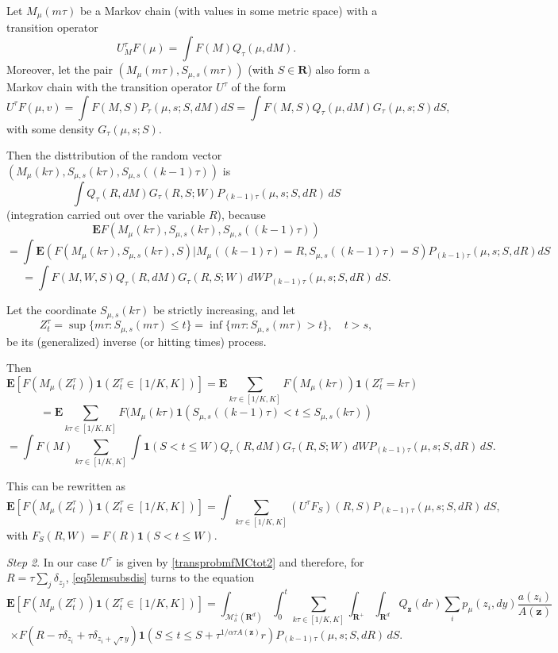 \documentclass[12pt]{article}
\def\MC{\mathcal{M}}
\def\E{\mathbf{E}}
\def\R{\mathbf{R}}
\def\1{\mathbf{1}}
\def\z{\mathbf{z}}
\def\al{\alpha}
\def\de{\delta}
\numberwithin{equation}{section}
\begin{document}
Let $M_{\mu}(m\tau)$ be a Markov chain (with values in some metric space)
with a transition operator
\[
U^{\tau}_M F(\mu)=\int F(M) Q_{\tau} (\mu,dM).
\]
Moreover, let the pair $(M_{\mu}(m\tau), S_{\mu,s}(m\tau))$ (with $S \in \R$) also form a Markov chain with the
transition operator $U^{\tau}$ of the form
\[
U^{\tau}F(\mu,v)=\int F(M,S) P_{\tau} (\mu,s; S, dM) dS
=\int F(M,S) Q_{\tau} (\mu,dM) G_{\tau} (\mu,s; S) dS,
\]
with some density  $G_{\tau} (\mu,s; S)$.

Then the disttribution of the random vector $(M_{\mu}(k\tau), S_{\mu,s}(k\tau), S_{\mu,s}((k-1)\tau))$ is
\begin{equation}
 \label{eqjointdis}
\int Q_{\tau}(R,dM) G_{\tau}(R,S;W) P_{(k-1)\tau}(\mu,s; S, dR)\, dS
\end{equation}
(integration carried out over the variable $R$),  because
\[
\E F (M_{\mu}(k\tau), S_{\mu,s}(k\tau), S_{\mu,s}((k-1)\tau))
\]
\[
=\int \E (F(M_{\mu}(k\tau), S_{\mu,s}(k\tau), S)|M_{\mu}((k-1)\tau)=R, S_{\mu,s}((k-1)\tau)=S)P_{(k-1)\tau}(\mu,s; S, dR) dS
\]
\[
=\int F(M, W, S)Q_{\tau}(R,dM) G_{\tau}(R,S;W) \, dW P_{(k-1)\tau}(\mu,s; S, dR) \, dS.
\]


Let the coordinate $S_{\mu,s}(k\tau)$ be strictly increasing, and let
\[
Z_t^{\tau}=\sup\{ m\tau : S_{\mu,s}(m\tau)\le t\}=\inf\{ m\tau: S_{\mu,s}(m\tau)> t\}, \quad t>s,
\]
be its (generalized) inverse (or hitting times) process.

Then
\[
\E [F(M_{\mu}(Z_t^{\tau}))\1(Z_t^{\tau}\in [1/K,K])]
=\E \sum_{k \tau \in  [1/K,K]} F(M_{\mu}(k\tau)) \1(Z^{\tau}_t=k\tau)
\]
\[
=\E \sum_{k \tau \in  [1/K,K]} F(M_{\mu}(k\tau) \1(S_{\mu,s}((k-1)\tau)<t\le S_{\mu,s}(k\tau))
\]
\begin{equation}
 \label{eq4lemsubsdis}
 = \int F(M) \sum_{k \tau \in  [1/K,K]} \int \1(S<t\le W)
  Q_{\tau}(R,dM) G_{\tau}(R,S;W) \, dW P_{(k-1)\tau}(\mu,s; S, dR) \, dS.
\end{equation}

This can be rewritten as
\begin{equation}
 \label{eq5lemsubsdis}
\E [F(M_{\mu}(Z_t^{\tau}))\1(Z_t^{\tau}\in [1/K,K])]
 = \int \sum_{k \tau \in  [1/K,K]} (U^{\tau}F_S)(R,S) P_{(k-1)\tau}(\mu,s; S, dR)\, dS,
\end{equation}
with $F_S(R,W)= F(R)  \1(S<t\le W)$.

{\it Step 2}. In our case $U^{\tau}$ is given by \eqref{transprobmfMCtot2} and therefore,
for $R=\tau \sum_j\de_{z_j}$,
\eqref{eq5lemsubsdis} turns to the equation
\[
\E [F(M_{\mu}(Z_t^{\tau}))\1(Z_t^{\tau}\in [1/K,K])]
 = \int_{\MC^+_{\delta}(\R^d)} \int_0^t \sum_{k \tau \in  [1/K,K]}
 \int_{\R^+} \int_{\R^d} Q_{\z}(dr)\sum_i p_{\mu}(z_i, dy)\frac{a(z_i)}{A(\z)}
\]
\begin{equation}
 \label{eq6lemsubsdis}
 \times
F\left(R-\tau\de_{z_i}+\tau\de_{z_i+\sqrt{\tau}y}\right) \1(S\le t\le S+\tau^{1/\al \tau A(\z)}r)
 P_{(k-1)\tau}(\mu,s; S, dR)\, dS.
\end{equation}
\end{document}
